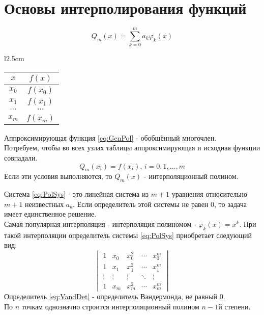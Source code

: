 \documentclass[a4paper,11pt]{article}
\begin{document}
\section{Основы интерполирования функций}
\begin{minipage}{1\linewidth}
  \begin{equation}
    Q_m(x) = \sum_{k=0}^{m} a_k \varphi_k(x)
    \label{eq:GenPol}
  \end{equation}
  \begin{wraptable}{l}{2.5cm}
    \begin{tabular}{ c|c }
      $x$ & $f(x)$ \\
      \hline
      $x_0$ & $f(x_0)$ \\
      $x_1$ & $f(x_1)$ \\
      $\cdots$ & $\cdots$ \\
      $x_m$ & $f(x_m)$
    \end{tabular}
  \end{wraptable}

  Аппроксимирующая функция \ref{eq:GenPol} - обобщённый многочлен. \\
  Потребуем, чтобы во всех узлах таблицы аппроксимирующая и исходная функции совпадали.
  \begin{equation}
    Q_m(x_i) = f(x_i), \, i = 0, 1, \dots, m
    \label{eq:PolSys}
  \end{equation}
  Если эти условия выполняются, то $Q_m(x)$ - интерполяционный полином.
\vspace{2mm}
\end{minipage}
\newline
Система \ref{eq:PolSys} - это линейная система из $m+1$ уравнения относительно $m+1$ неизвестных $a_k$. Если определитель этой системы не равен $0$, то задача имеет единственное решение. \\
\newline
Самая популярная интерполяция - интерполяция полиномом - \(\varphi_k(x) = x^k\).
При такой интерполяции определитель системы \ref{eq:PolSys} приобретает следующий вид:
\begin{equation}
  \begin{vmatrix}
    1 & x_0 & x_0^2 & \cdots & x_0^m \\
    1 & x_1 & x_1^2 & \cdots & x_1^m \\
    \vdots & \vdots & \vdots & \ddots & \vdots \\
    1 & x_m & x_m^2 & \cdots & x_m^m
  \end{vmatrix}
  \label{eq:VandDet}
\end{equation}
Определитель \ref{eq:VandDet} - определитель Вандермонда, не равный $0$. \\
По $n$ точкам однозначно строится интерполяционный полином $n-1$й степени. \\
\end{document}
